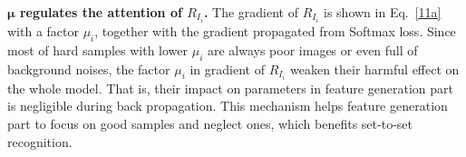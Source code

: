 \textbf{$\mathbf{\mu}$ regulates the attention of $R_{I_i}$.}
The gradient of $R_{I_i}$ is shown in Eq.~\ref{11a} with a factor  $\mu_i$, together with the gradient propagated from Softmax loss. Since most of hard samples with lower $\mu_i$ are always poor images or even full of background noises, the factor $\mu_i$ in gradient of  $R_{I_i}$ weaken their harmful effect on the whole model. That is, their impact on parameters in feature generation part is negligible during back propagation. This mechanism helps feature generation part to focus on good samples and neglect ones, which benefits set-to-set recognition.










